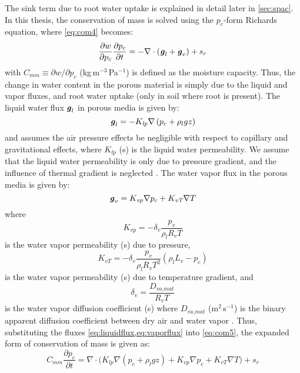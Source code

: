 The sink term due to root water uptake is explained in detail later in \cref{sec:spac}. In this thesis, the conservation of mass is solved using the $p_c$-form Richards equation, where \cref{eq:com4} becomes:
\begin{equation}
\frac{\partial w}{\partial p_c} \frac{\partial p_c}{\partial t} = -  \nabla \cdot \left(\textbf{\textit{g}}_l + \textbf{\textit{g}}_v\right) + s_{r}
\label{eq:com5}
\end{equation}
with $C_{mm} \equiv \partial w/ \partial p_c$ (kg\,m$^{-3}$\,Pa$^{-1}$) is defined as the moisture capacity. Thus, the change in water content in the porous material is simply due to the liquid and vapor fluxes, and root water uptake (only in soil where root is present). The liquid water flux $\textbf{\textit{g}}_l$ in porous media is given by:
\begin{equation}
\textbf{\textit{g}}_l = - K_{\textit{lp}} \nabla \left(p_c + \rho_l g z\right)
\label{eq:liquidflux}
\end{equation}
and assumes the air pressure effects be negligible with respect to capillary and gravitational effects, where $K_{\textit{lp}}$ (s) is the liquid water permeability. We assume that the liquid water permeability is only due to pressure gradient, and the influence of thermal gradient is neglected \citep{Carmeliet2005}. The water vapor flux in the porous media is given by:
\begin{equation}
\textbf{\textit{g}}_v = K_{\textit{vp}}\nabla p_c + K_{\textit{vT}}\nabla T
\label{eq:vaporflux}
\end{equation}
where
\begin{equation}
K_{\textit{vp}} = - \delta_v \frac{p_v}{\rho_l R_v T}
\end{equation}
is the water vapor permeability (s) due to pressure,  
\begin{equation}
K_{\textit{vT}} = - \delta_v \frac{p_v}{\rho_l R_v T^2}\left(\rho_l L_v - p_c\right)
\end{equation}
is the water vapor permeability (s) due to temperature gradient, and
\begin{equation}
\delta_v = \frac{D_{\textit{va,mat}}}{R_v T}
\end{equation}
is the water vapor diffusion coefficient (s) where $D_{\textit{va,mat}}$ (m$^2$\,s$^{-1}$) is the binary apparent diffusion coefficient between dry air and water vapor \citep{Carmeliet2005, Defraeye2011, Saneinejad2013, Kubilay2014b}. Thus, substituting the fluxes \cref{eq:liquidflux,eq:vaporflux} into \cref{eq:com5}, the expanded form of conservation of mass is given as:
\begin{equation}
C_{\textit{mm}}\frac{\partial p_c}{\partial t} = \nabla \cdot \Big( K_{lp} \nabla \left(p_c + \rho_l g z\right) + K_{\textit{vp}}\nabla p_c + K_{\textit{vT}}\nabla T \Big) + s_r
\label{eq:com6}
\end{equation}

